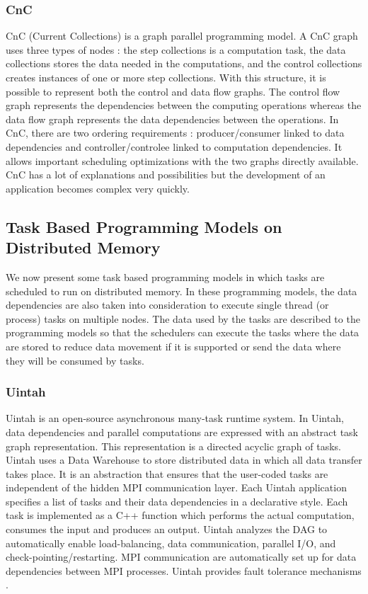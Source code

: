 \subsubsection{CnC}
CnC \cite{ChaKV2010} \cite{BBCKL2010} (Current Collections) is a graph parallel programming model.
A CnC graph uses three types of nodes : the step collections is a computation task, the data collections stores the data needed in the computations, and the control collections creates instances of one or more step collections.
With this structure, it is possible to represent both the control and data flow graphs.
The control flow graph represents the dependencies between the computing operations whereas the data flow graph represents the data dependencies between the operations.
In CnC, there are two ordering requirements : producer/consumer linked to data dependencies and controller/controlee linked to computation dependencies.
It allows important scheduling optimizations with the two graphs directly available.
CnC has a lot of explanations and possibilities but the development of an application becomes complex very quickly.

\subsection{Task Based Programming Models on Distributed Memory}
We now present some task based programming models in which tasks are scheduled to run on distributed memory.
In these programming models, the data dependencies are also taken into consideration to execute single thread (or process) tasks on multiple nodes.
The data used by the tasks are described to the programming models so that the schedulers can execute the tasks where the data are stored to reduce data movement if it is supported or send the data where they will be consumed by tasks.

\subsubsection{Uintah}
Uintah \cite{GeCPJ2000} \cite{HumpB2019} is an open-source asynchronous many-task runtime system.
In Uintah, data dependencies and parallel computations are expressed with an abstract task graph representation.
This representation is a directed acyclic graph of tasks.
Uintah uses a Data Warehouse to store distributed data in which all data transfer takes place.
It is an abstraction that ensures that the user-coded tasks are independent of the hidden MPI communication layer.
Each Uintah application specifies a list of tasks and their data dependencies in a declarative style.
Each task is implemented as a C++ function which performs the actual computation, consumes the input and produces an output.
Uintah analyzes the DAG to automatically enable load-balancing, data communication, parallel I/O, and check-pointing/restarting.
MPI communication are automatically set up for data dependencies between MPI processes.
Uintah provides fault tolerance mechanisms \cite{SahaB2019}.

